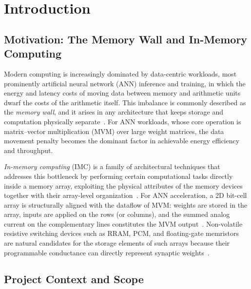 
\chapter{Introduction}
\label{ch:introduction}

\section{Motivation: The Memory Wall and In-Memory Computing}
\label{sec:intro-motivation}

Modern computing is increasingly dominated by data-centric workloads, most
prominently artificial neural network (ANN) inference and training, in which
the energy and latency costs of moving data between memory and arithmetic
units dwarf the costs of the arithmetic itself. This imbalance is commonly
described as the \emph{memory wall}, and it arises in any architecture that
keeps storage and computation physically separate~\cite{Ielmini2018RRAM,
Verma2019IMC, Sebastian2020IMC}. For ANN workloads, whose core operation is
matrix--vector multiplication (MVM) over large weight matrices, the data
movement penalty becomes the dominant factor in achievable energy efficiency
and throughput.

\emph{In-memory computing} (IMC) is a family of architectural techniques
that addresses this bottleneck by performing certain computational tasks
directly inside a memory array, exploiting the physical attributes of the
memory devices together with their array-level
organization~\cite{Sebastian2020IMC}. For ANN acceleration, a 2D bit-cell
array is structurally aligned with the dataflow of MVM: weights are stored
in the array, inputs are applied on the rows (or columns), and the summed
analog current on the complementary lines constitutes the MVM
output~\cite{Verma2019IMC}. Non-volatile resistive switching devices such as
RRAM, PCM, and floating-gate memristors are natural candidates for the
storage elements of such arrays because their programmable conductance can
directly represent synaptic weights~\cite{Ielmini2018RRAM, Wang2022YFlash}.

\section{Project Context and Scope}
\label{sec:intro-context}

